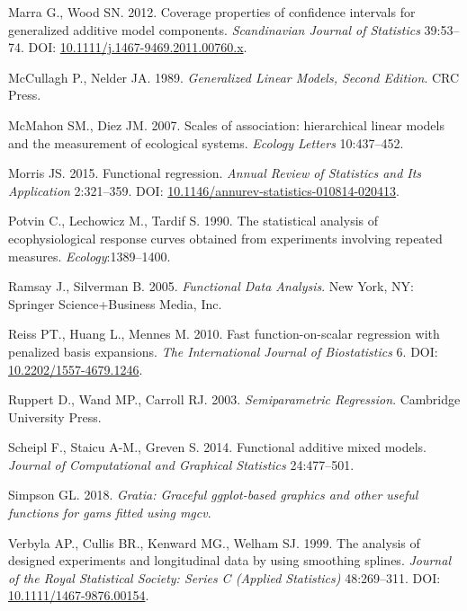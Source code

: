 \documentclass[12pt]{article}
\begin{document}
\hypertarget{ref-marra_coverage_2012}{}
Marra G., Wood SN. 2012. Coverage properties of confidence intervals for
generalized additive model components. \emph{Scandinavian Journal of
Statistics} 39:53--74. DOI:
\href{https://doi.org/10.1111/j.1467-9469.2011.00760.x}{10.1111/j.1467-9469.2011.00760.x}.

\hypertarget{ref-McCullagh:1989ti}{}
McCullagh P., Nelder JA. 1989. \emph{Generalized Linear Models, Second
Edition}. CRC Press.

\hypertarget{ref-McMahon:2007ju}{}
McMahon SM., Diez JM. 2007. Scales of association: hierarchical linear
models and the measurement of ecological systems. \emph{Ecology Letters}
10:437--452.

\hypertarget{ref-morris_functional_2015}{}
Morris JS. 2015. Functional regression. \emph{Annual Review of
Statistics and Its Application} 2:321--359. DOI:
\href{https://doi.org/10.1146/annurev-statistics-010814-020413}{10.1146/annurev-statistics-010814-020413}.

\hypertarget{ref-potvin_statistical_1990}{}
Potvin C., Lechowicz M., Tardif S. 1990. The statistical analysis of
ecophysiological response curves obtained from experiments involving
repeated measures. \emph{Ecology}:1389--1400.

\hypertarget{ref-ramsay_functional_2005}{}
Ramsay J., Silverman B. 2005. \emph{Functional Data Analysis}. New York,
NY: Springer Science+Business Media, Inc.

\hypertarget{ref-reiss_fast_2010}{}
Reiss PT., Huang L., Mennes M. 2010. Fast function-on-scalar regression
with penalized basis expansions. \emph{The International Journal of
Biostatistics} 6. DOI:
\href{https://doi.org/10.2202/1557-4679.1246}{10.2202/1557-4679.1246}.

\hypertarget{ref-Ruppert:2003uc}{}
Ruppert D., Wand MP., Carroll RJ. 2003. \emph{Semiparametric
Regression}. Cambridge University Press.

\hypertarget{ref-scheipl_functional_2014}{}
Scheipl F., Staicu A-M., Greven S. 2014. Functional additive mixed
models. \emph{Journal of Computational and Graphical Statistics}
24:477--501.

\hypertarget{ref-simpson_gratia_2018}{}
Simpson GL. 2018. \emph{Gratia: Graceful ggplot-based graphics and other
useful functions for gams fitted using mgcv}.

\hypertarget{ref-verbyla_analysis_2002}{}
Verbyla AP., Cullis BR., Kenward MG., Welham SJ. 1999. The analysis of
designed experiments and longitudinal data by using smoothing splines.
\emph{Journal of the Royal Statistical Society: Series C (Applied
Statistics)} 48:269--311. DOI:
\href{https://doi.org/10.1111/1467-9876.00154}{10.1111/1467-9876.00154}.
\end{document}

